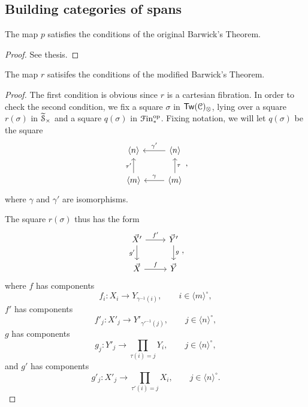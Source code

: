 \documentclass[main.tex]{subfiles}
\begin{document}
\subsection{Building categories of spans}
\label{ssc:building_categories_of_spans}

\begin{proposition}
  The map $p$ satisfies the conditions of the original Barwick's Theorem.
\end{proposition}
\begin{proof}
  See thesis.
\end{proof}

\begin{proposition}
  The map $r$ satisifes the conditions of the modified Barwick's Theorem.
\end{proposition}
\begin{proof}
  The first condition is obvious since $r$ is a cartesian fibration. In order to check the second condition, we fix a square $\sigma$ in $\mathsf{Tw}(\mathcal{C})_{\otimes}$, lying over a square $r(\sigma)$ in $\widetilde{\mathcal{S}}_{\times}$ and a square $q(\sigma)$ in $\mathcal{F}\mathrm{in}_{*}^{\mathrm{op}}$. Fixing notation, we will let $q(\sigma)$ be the square
  \begin{equation*}
    \begin{tikzcd}
      \langle n \rangle
      & \langle n \rangle
      \arrow[l, swap, "\gamma'"]
      \\
      \langle m \rangle
      \arrow[u, "\tau'"]
      & \langle m \rangle
      \arrow[u, swap, "\tau"]
      \arrow[l, swap, "\gamma"]
    \end{tikzcd},
  \end{equation*}
  where $\gamma$ and $\gamma'$ are isomorphisms.

  The square $r(\sigma)$ thus has the form
  \begin{equation*}
    \begin{tikzcd}
      \vec{X}'
      \arrow[r, "f'"]
      \arrow[d, swap, "g'"]
      & \vec{Y}'
      \arrow[d, "g"]
      \\
      \vec{X}
      \arrow[r, "f"]
      & \vec{Y}
    \end{tikzcd},
  \end{equation*}
  where $f$ has components
  \begin{equation*}
    f_{i}\colon X_{i} \to Y_{\gamma^{-1}(i)},\qquad i \in \langle m \rangle^{\circ},
  \end{equation*}
  $f'$ has components
  \begin{equation*}
    f'_{j}\colon X'_{j} \to Y'_{\gamma'^{-1}(j)},\qquad j \in \langle n \rangle^{\circ},
  \end{equation*}
  $g$ has components
  \begin{equation*}
    g_{j}\colon Y'_{j} \to \prod_{\tau(i) = j} Y_{i},\qquad j \in \langle n \rangle^{\circ},
  \end{equation*}
  and $g'$ has components
  \begin{equation*}
    g'_{j}\colon X'_{j} \to \prod_{\tau'(i) = j} X_{i},\qquad j \in \langle n \rangle^{\circ}.
  \end{equation*}


\end{proof}
\end{document}
